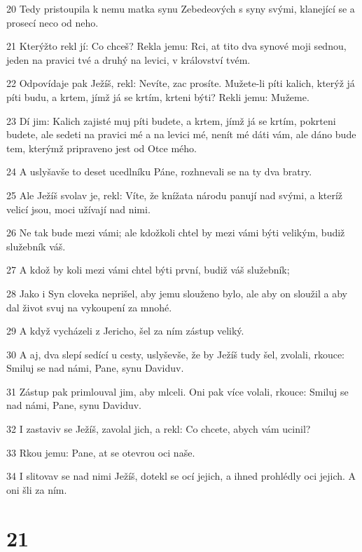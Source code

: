 \par 20 Tedy pristoupila k nemu matka synu Zebedeových s syny svými, klanející se a prosecí neco od neho.
\par 21 Kterýžto rekl jí: Co chceš? Rekla jemu: Rci, at tito dva synové moji sednou, jeden na pravici tvé a druhý na levici, v království tvém.
\par 22 Odpovídaje pak Ježíš, rekl: Nevíte, zac prosíte. Mužete-li píti kalich, kterýž já píti budu, a krtem, jímž já se krtím, krteni býti? Rekli jemu: Mužeme.
\par 23 Dí jim: Kalich zajisté muj píti budete, a krtem, jímž já se krtím, pokrteni budete, ale sedeti na pravici mé a na levici mé, nenít mé dáti vám, ale dáno bude tem, kterýmž pripraveno jest od Otce mého.
\par 24 A uslyšavše to deset ucedlníku Páne, rozhnevali se na ty dva bratry.
\par 25 Ale Ježíš svolav je, rekl: Víte, že knížata národu panují nad svými, a kteríž velicí jsou, moci užívají nad nimi.
\par 26 Ne tak bude mezi vámi; ale kdožkoli chtel by mezi vámi býti velikým, budiž služebník váš.
\par 27 A kdož by koli mezi vámi chtel býti první, budiž váš služebník;
\par 28 Jako i Syn cloveka neprišel, aby jemu slouženo bylo, ale aby on sloužil a aby dal život svuj na vykoupení za mnohé.
\par 29 A když vycházeli z Jericho, šel za ním zástup veliký.
\par 30 A aj, dva slepí sedící u cesty, uslyševše, že by Ježíš tudy šel, zvolali, rkouce: Smiluj se nad námi, Pane, synu Daviduv.
\par 31 Zástup pak primlouval jim, aby mlceli. Oni pak více volali, rkouce: Smiluj se nad námi, Pane, synu Daviduv.
\par 32 I zastaviv se Ježíš, zavolal jich, a rekl: Co chcete, abych vám ucinil?
\par 33 Rkou jemu: Pane, at se otevrou oci naše.
\par 34 I slitovav se nad nimi Ježíš, dotekl se ocí jejich, a ihned prohlédly oci jejich. A oni šli za ním.

\chapter{21}

